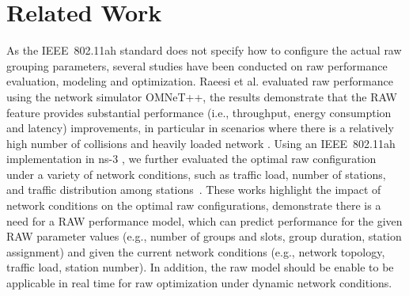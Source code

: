 \section{Related Work \label{sec:related_work}}


As the IEEE~802.11ah standard does not specify how to configure the actual \gls{raw} grouping parameters, several studies have been conducted on \gls{raw} performance evaluation, modeling and optimization. Raeesi et al. evaluated  \gls{raw} performance using the network simulator OMNeT++, the results demonstrate that the RAW feature provides
substantial performance (i.e., throughput, energy consumption and latency) improvements, in particular in scenarios where there is a relatively high number of collisions and heavily loaded network \cite{Raeesi2014a}. Using an IEEE~802.11ah implementation in ns-3
\cite{WNS32016}, we further evaluated the optimal \gls{raw}  configuration under a variety of network conditions, such as traffic load, number of stations, and traffic distribution among stations~\cite{WoWMoM2016}. These works highlight the impact of network conditions on the optimal \gls{raw} configurations, demonstrate there is a need for a \gls{RAW} performance model, which can predict performance for the given RAW parameter values (e.g., number of groups and slots, group duration, station assignment) and given the current network conditions (e.g., network topology, traffic load, station number). In addition, the \gls{raw} model should be enable to be applicable in real time for \gls{raw} optimization under dynamic network conditions.




